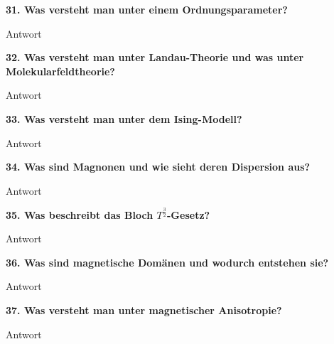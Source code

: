 \noindent\textbf{31. Was versteht man unter einem Ordnungsparameter?}\\
\begin{addmargin}[25pt]{0pt}
Antwort\\
\end{addmargin}

\noindent\textbf{32. Was versteht man unter Landau-Theorie und was unter Molekularfeldtheorie?}\\
\begin{addmargin}[25pt]{0pt}
Antwort\\
\end{addmargin}

\noindent\textbf{33. Was versteht man unter dem Ising-Modell?}\\
\begin{addmargin}[25pt]{0pt}
Antwort\\
\end{addmargin}

\noindent\textbf{34. Was sind Magnonen und wie sieht deren Dispersion aus?}\\
\begin{addmargin}[25pt]{0pt}
Antwort\\
\end{addmargin}

\noindent\textbf{35. Was beschreibt das Bloch $T^{\frac{3}{2}}$-Gesetz?}\\
\begin{addmargin}[25pt]{0pt}
Antwort\\
\end{addmargin}

\noindent\textbf{36. Was sind magnetische Domänen und wodurch entstehen sie?}\\
\begin{addmargin}[25pt]{0pt}
Antwort\\
\end{addmargin}

\noindent\textbf{37. Was versteht man unter magnetischer Anisotropie?}\\
\begin{addmargin}[25pt]{0pt}
Antwort\\
\end{addmargin}


